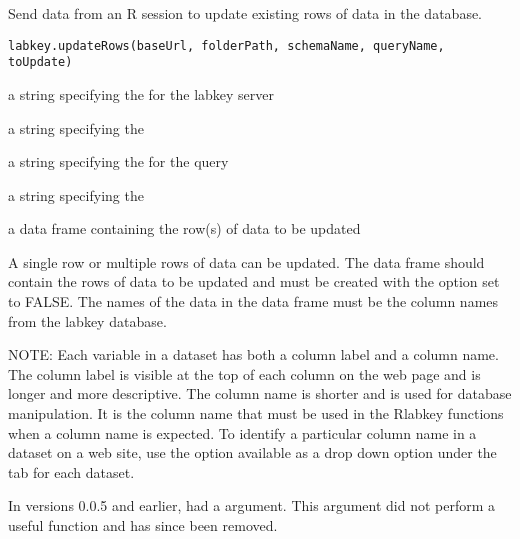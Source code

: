 \documentclass{book}
\begin{document}
\begin{Description}\relax
Send data from an R session to update existing rows of data in the database.
\end{Description}
\begin{Usage}
\begin{verbatim}
labkey.updateRows(baseUrl, folderPath, schemaName, queryName, toUpdate) 
\end{verbatim}
\end{Usage}
\begin{Arguments}
\begin{ldescription}
\item[\code{baseUrl}] a string specifying the for the labkey server
\item[\code{folderPath}] a string specifying the  
\item[\code{schemaName}] a string specifying the  for the query
\item[\code{queryName}] a string specifying the  
\item[\code{toUpdate}] a data frame containing the row(s) of data to be updated
\end{ldescription}
\end{Arguments}
\begin{Details}\relax
A single row or multiple rows of data can be updated.  The  data frame should contain 
the rows of data to be updated and must be created with the  option
set to FALSE. The names of the data in the data frame must be the column names from the
labkey database. 

NOTE: Each variable in a dataset has both a column label and a column name. The column label is visible at the top
of each column on the web page and is longer and more descriptive. The column name is shorter and is
used  for database manipulation. It is the column name that must be used in
the Rlabkey functions when a column name is expected. To identify a particular column name in a dataset on
a web site, use the  option available as a drop down option under the 
tab for each dataset.

In versions 0.0.5 and earlier,  had a  argument. This argument did not perform a useful function and has since been removed.
\end{Details}
\end{document}
